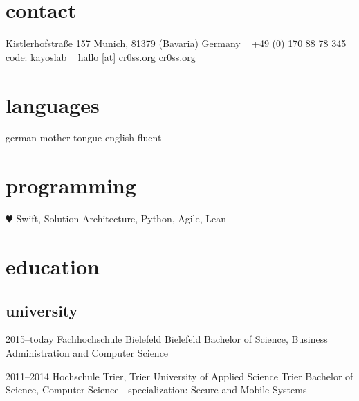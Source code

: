 \documentclass[]{friggeri-cv} %
\begin{document}


\begin{aside} %
	\section{contact}
	Kistlerhofstraße 157
	Munich, 81379 
	(Bavaria) Germany
	~
	+49 (0) 170 88 78 345
	code: \href{https://github.com/kayoslab}{kayoslab}
	~
	\href{mailto:hallo@cr0ss.org}{hallo [at] cr0ss.org}
	\href{https://cr0ss.org}{cr0ss.org}
	\section{languages}
	german mother tongue
	english fluent
	\section{programming}
	{\color{red} $\varheartsuit$} Swift,
	Solution Architecture,
	Python, Agile, Lean
\end{aside}


\section{education}

\subsection{university}

\begin{entrylist}
	
	\entry
	{2015--today}
	{Fachhochschule Bielefeld}
	{Bielefeld}
	{Bachelor of Science, Business Administration and Computer Science}
	
	
	\entry
	{2011--2014}
	{Hochschule Trier, Trier University of Applied Science}
	{Trier}
	{Bachelor of Science, Computer Science - specialization: Secure and Mobile Systems}
	
	
\end{entrylist}
\end{document}

